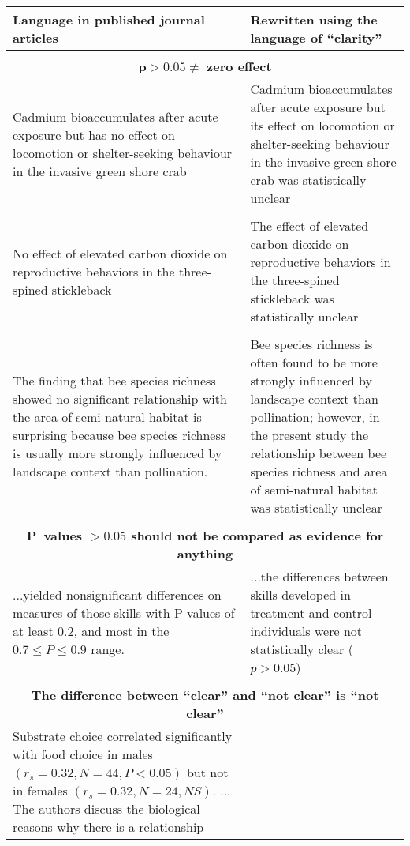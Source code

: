 \begin{tabular}{p{7.5cm}p{7.5cm}}
     Language in published journal articles & Rewritten using the language of ``clarity'' \\
     	\hline
        \\
     \multicolumn{2}{c}{$\mathbf{p > 0.05 \neq}$ \textbf{zero effect}} \\
        Cadmium bioaccumulates after acute exposure but has no effect on locomotion or shelter-seeking behaviour in the
        invasive green shore crab & Cadmium bioaccumulates after acute exposure but its effect on locomotion or shelter-seeking 
        behaviour in the invasive green shore crab was statistically unclear \\ 
        \\
        No effect of elevated carbon dioxide on reproductive behaviors in the three-spined stickleback & The effect of elevated 
        carbon dioxide on reproductive behaviors in the three-spined stickleback was statistically unclear \\
        \\
        The finding that bee species richness showed no significant relationship with the area of semi-natural habitat is 
        surprising because bee species richness is usually more strongly influenced by landscape context than pollination.
& 
        Bee species richness is often found to be more strongly influenced by landscape context than pollination; however, 
        in the present study the relationship between bee species richness and area of semi-natural habitat was statistically 
        unclear \\ 
        \\
     \multicolumn{2}{c}{\textbf{P~values $\mathbf{> 0.05}$ should not be compared as evidence for anything}} \\
        ...yielded nonsignificant differences on measures of those skills with P values of at least 0.2, and most in the
        $0.7 \leq P \leq 0.9$ range.
& ...the differences between skills developed in treatment and control individuals
        were not statistically clear ($p > 0.05$) \\
        \\
     \multicolumn{2}{c}{\textbf{The difference between ``clear'' and ``not clear'' is ``not clear''}} \\
        Substrate choice correlated significantly with food choice in males $(r_{s} = 0.32, N = 44, P < 0.05)$ but not in
        females $(r_{s} = 0.32, N = 24, NS)$. ... The authors discuss the biological reasons why there is a relationship 

\end{tabular}
